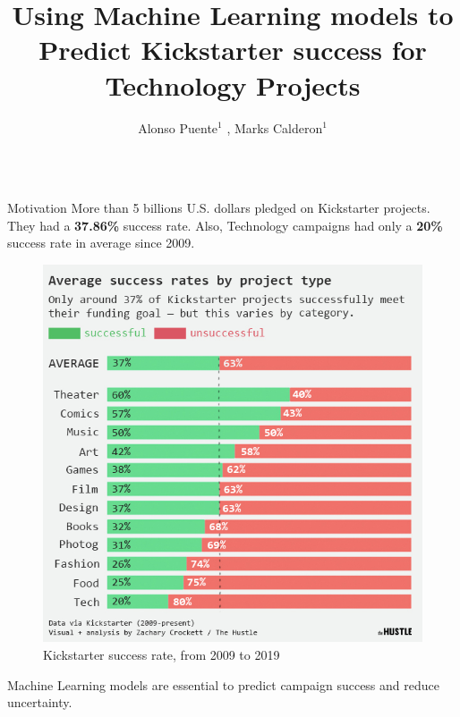 \documentclass[final]{beamer}
\title{Using Machine Learning models to Predict Kickstarter success for Technology Projects} %
\author{Alonso Puente$^{1}$ , Marks Calderon$^{1}$} %
\institute{$^{1}$ESAN University} %
\newlength{\sepwid}
\newlength{\onecolwid}
\begin{document}

\setlength{\belowcaptionskip}{1ex} %
\setlength\belowdisplayshortskip{1ex} %

\begin{frame}[t] %

\begin{columns}[t] %


\begin{column}{\onecolwid} %



\begin{block}{Motivation}
More than 5 billions U.S. dollars pledged on Kickstarter projects. They had a \textbf{37.86\%} success rate. Also, Technology campaigns had only a \textbf{20\%} success rate in average since 2009. 
	\begin{figure}
		\includegraphics[width=0.6\linewidth]{kickstarter_success_rate_2009_2019.jpg}
		\caption{Kickstarter success rate, from 2009 to 2019}
	\end{figure}

Machine Learning models are essential to predict campaign success and reduce uncertainty.


\end{block}
\end{column}
\end{columns}
\end{frame}
\end{document}
